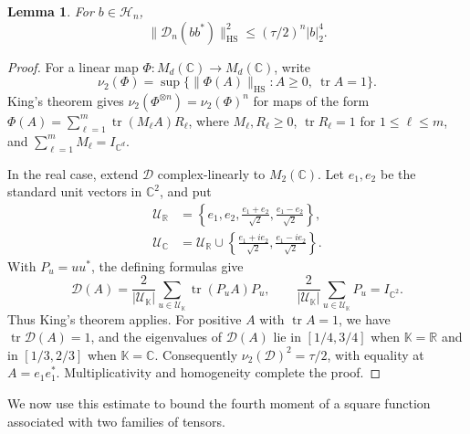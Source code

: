 \documentclass[11pt,a4paper,reqno]{amsart}
\newtheorem{lemma}[lemma]{Lemma}
\theoremstyle{definition}
\newcommand{\R}{\mathbb R}
\newcommand{\C}{\mathbb C}
\newcommand{\norm}[1]{\lVert #1\rVert}
\DeclareMathOperator{\tr}{tr}
\numberwithin{equation}{section}
\begin{document}
\begin{lemma}\label{lem:rank-one-moment}
For $b\in\mathcal H_n$,
\begin{equation*}
 \norm{\mathcal D_n(bb^*)}_{\mathrm{HS}}^2
 \leq(\tau/2)^n|b|_2^4.
\end{equation*}
\end{lemma}

\begin{proof}
For a linear map $\Phi\colon M_d(\C)\to M_d(\C)$, write
\begin{equation*}
 \nu_2(\Phi)=\sup\{\norm{\Phi(A)}_{\mathrm{HS}}:A\geq0,\ \tr A=1\}.
\end{equation*}
King's theorem \cite[Theorem~1]{King2003} gives $\nu_2(\Phi^{\otimes n})=\nu_2(\Phi)^n$ for maps of the form $\Phi(A)=\sum_{\ell=1}^{m}\tr(M_\ell A)R_\ell$, where $M_\ell,R_\ell\geq0$, $\tr R_\ell=1$ for $1\leq\ell\leq m$, and $\sum_{\ell=1}^{m}M_\ell=I_{\C^d}$.

In the real case, extend $\mathcal D$ complex-linearly to $M_2(\C)$. Let $e_1,e_2$ be the standard unit vectors in $\C^2$, and put
\begin{equation*}
 \begin{aligned}
 \mathcal U_{\R}&=\left\{e_1,e_2,\frac{e_1+e_2}{\sqrt2},
                                    \frac{e_1-e_2}{\sqrt2}\right\},\\
 \mathcal U_{\C}&=\mathcal U_{\R}\cup
                  \left\{\frac{e_1+ie_2}{\sqrt2},
                         \frac{e_1-ie_2}{\sqrt2}\right\}.
 \end{aligned}
\end{equation*}
With $P_u=uu^*$, the defining formulas give
\begin{equation*}
 \mathcal D(A)=\frac{2}{|\mathcal U_{\mathbb K}|}
                  \sum_{u\in\mathcal U_{\mathbb K}}\tr(P_uA)P_u,
 \qquad \frac{2}{|\mathcal U_{\mathbb K}|}
                  \sum_{u\in\mathcal U_{\mathbb K}}P_u=I_{\C^2}.
\end{equation*}
Thus King's theorem applies. For positive $A$ with $\tr A=1$, we have $\tr\mathcal D(A)=1$, and the eigenvalues of $\mathcal D(A)$ lie in $[1/4,3/4]$ when $\mathbb K=\R$ and in $[1/3,2/3]$ when $\mathbb K=\C$. Consequently $\nu_2(\mathcal D)^2=\tau/2$, with equality at $A=e_1e_1^*$. Multiplicativity and homogeneity complete the proof.
\end{proof}

We now use this estimate to bound the fourth moment of a square function associated with two families of tensors.
\end{document}
